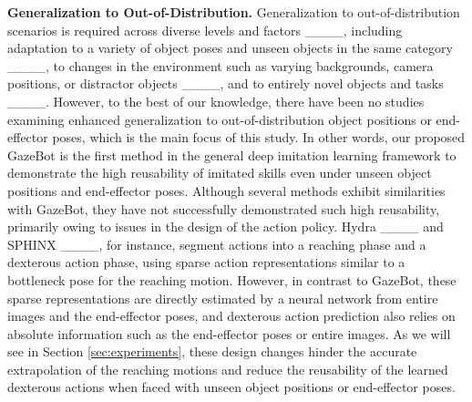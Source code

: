 \textbf{Generalization to Out-of-Distribution.} 
Generalization to out-of-distribution scenarios is required across diverse levels and factors ____, including adaptation to a variety of object poses and unseen objects in the same category ____, to changes in the environment such as varying backgrounds, camera positions, or distractor objects ____, and to entirely novel objects and tasks ____. 
However, to the best of our knowledge, there have been no studies examining enhanced generalization to out-of-distribution object positions or end-effector poses, which is the main focus of this study.
In other words, our proposed GazeBot is the first method in the general deep imitation learning framework to demonstrate the high reusability of imitated skills even under unseen object positions and end-effector poses.
Although several methods exhibit similarities with GazeBot, they have not successfully demonstrated such high reusability, primarily owing to issues in the design of the action policy. 
Hydra ____ and SPHINX ____, for instance, segment actions into a reaching phase and a dexterous action phase, using sparse action representations similar to a bottleneck pose for the reaching motion. 
However, in contrast to GazeBot, these sparse representations are directly estimated by a neural network from entire images and the end-effector poses, and dexterous action prediction also relies on absolute information such as the end-effector poses or entire images. As we will see in Section \ref{sec:experiments}, these design changes hinder the accurate extrapolation of the reaching motions and reduce the reusability of the learned dexterous actions when faced with unseen object positions or end-effector poses.